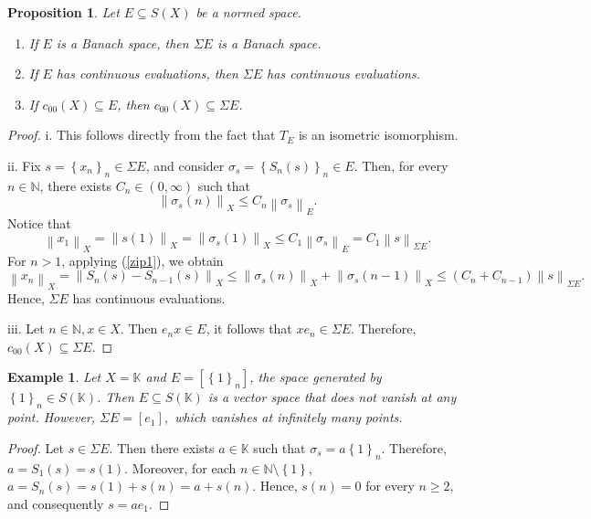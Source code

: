 \documentclass[14pt, a4paper]{article}  %
\providecommand{\corchete}[1]{\left[#1\right]}
\providecommand{\llave}[1]{\left\lbrace #1\right\rbrace }
\providecommand{\pare}[1]{\left( #1\right) }
\providecommand{\norm}[1]{\left\lVert#1\right\rVert}
\newcommand{\K}{\mathbb{K}}
\newcommand{\N}{\mathbb{N}}
\newtheorem{proposition}{Proposition}[section]
\newtheorem{example}{Example}[section]  %
\begin{document}
	\begin{proposition}\label{g1_0_new} Let $E\subseteq S\pare{X}$ be a normed space.
		\begin{enumerate}
			\item[i.]  If $E$ is a Banach space, then $\Sigma E$ is a Banach space.
			\item[ii.]   If $E$ has continuous evaluations, then $\Sigma E$ has continuous evaluations.
			\item[iii.] If $c_{00}\pare{X}\subseteq E$, then $c_{00}\pare{X}\subseteq \Sigma E$.
		\end{enumerate} 
	\end{proposition} 
\begin{proof}
	i. This follows directly from the fact that $T_{E}$ is an isometric isomorphism.
	
	ii. Fix $s=\llave{x_{n}}_{n}\in \Sigma E$, and consider $\sigma_{s}=\llave{S_{n}\pare{s}}_{n}\in   E$. Then, for every $n\in \N$, there exists $C_{n}\in(0,\infty)$ such that 
	\begin{equation}
		\norm{\sigma_{s}\pare{n}}_{X}\leq C_{n}\norm{\sigma_{s}}_{E}.
	\end{equation}\label{zip1}
	Notice that
	\begin{equation}
		\norm{x_{1}}_{X}=\norm{s\pare{1}}_{X}=\norm{\sigma_{s}\pare{1}}_{X}\leq C_{1}\norm{\sigma_{s}}_{E}=C_{1}\norm{s}_{\Sigma E}.
	\end{equation}
	For $n>1$, applying (\ref{zip1}), we obtain
	\begin{equation}
		\norm{x_{n}}_{X}=\norm{S_{n}\pare{s}-S_{n-1}\pare{s}}_{X}\leq \norm{\sigma_{s}\pare{n}}_{X}+\norm{\sigma_{s}\pare{n-1}}_{X} \leq  \pare{C_{n}+C_{n-1}}\norm{s}_{\Sigma E}.
	\end{equation}
	Hence, $\Sigma E$ has continuous evaluations.
	
	iii. Let $n \in \N, x \in X$. Then  $e_{n}x\in E$, it follows that $xe_{n}\in \Sigma E$. Therefore, $c_{00}\pare{X}\subseteq \Sigma E$.
\end{proof}

\begin{example}
	Let $X=\K$ and 
	$
	E=\corchete{\llave{1}_{n}}
	$,  the space generated by $\llave{1}_{n}\in S\pare{\K}$.
	Then $E\subseteq S\pare{\K}$ is a vector space that does not vanish at any point. However,
	$
	\Sigma E=\corchete{e_{1}},
	$
	which vanishes at infinitely many points.
\end{example}
\begin{proof}
	Let $s\in \Sigma E$. Then there exists $a\in \K$ such that $\sigma_{s}=a\llave{1}_{n}$. Therefore,
	$
	a=S_{1}(s)=s\pare{1}.
	$
	Moreover, for each $n\in \N\setminus \llave{1}$,
	$
	a=S_{n}\pare{s}=s\pare{1}+s\pare{n}=a+s\pare{n}.
	$
	Hence, $s\pare{n}=0$ for every $n\geq 2$, and consequently $s=ae_{1}$.
\end{proof}
	
\end{document}

